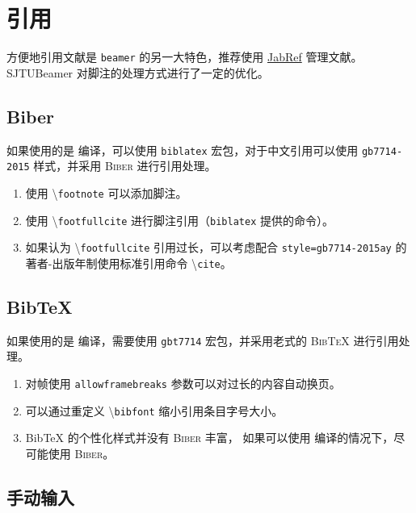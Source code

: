 \documentclass[
    UTF8,
    heading=true,
    12pt,
    a4paper
]{ctexrep}
\newenvironment{commentlist}
{\begin{enumerate}\small}
{\end{enumerate}}
\newcommand{\cmd}[1]{\textbackslash{}\texttt{#1}}
\newcommand{\cls}[1]{\texttt{#1}}
\newcommand{\pkg}[1]{\texttt{#1}}
\newcommand{\opt}[1]{\texttt{#1}}
\def\themename{\textsf{SJTUBeamer}}
\begin{document}
\chapter{引用}

方便地引用文献是 \cls{beamer} 的另一大特色，推荐使用
\href{https://www.jabref.org/}{JabRef}
管理文献。\themename{} 对脚注的处理方式进行了一定的优化。

\section{Biber}

\faApple{} \faLinux{} 如果使用的是 
编译，可以使用 \pkg{biblatex} 宏包，对于中文引用可以使用
\opt{gb7714-2015} 样式，并采用 \textsc{Biber} 进行引用处理。


\begin{commentlist}
  \item 使用 \cmd{footnote} 可以添加脚注。
  \item 使用 \cmd{footfullcite}
  进行脚注引用（\pkg{biblatex} 提供的命令）。
  \item 如果认为 \cmd{footfullcite} 引用过长，可以考虑配合
  \opt{style=gb7714-2015ay} 的著者-出版年制使用标准引用命令
  \cmd{cite}。
\end{commentlist}

\section{Bib\TeX{}}

\faWindows 如果使用的是  编译，需要使用
\pkg{gbt7714} 宏包，并采用老式的 \textsc{Bib\TeX{}}
进行引用处理。


\begin{commentlist}
  \item 对帧使用 \verb"allowframebreaks"
  参数可以对过长的内容自动换页。
  \item 可以通过重定义 \cmd{bibfont} 缩小引用条目字号大小。
  \item Bib\TeX{} 的个性化样式并没有 \textsc{Biber} 丰富， 如果可以使用  编译的情况下，尽可能使用
  \textsc{Biber}。
\end{commentlist}

\section{手动输入}
\end{document}
